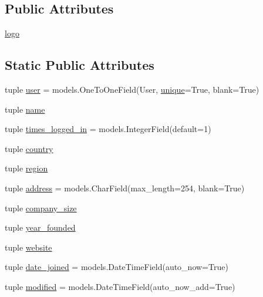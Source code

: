 \subsection*{Public Attributes}
\begin{DoxyCompactItemize}
\item 
\hyperlink{classcompanies_1_1models_1_1_company_a49b6b6445f101f0dae90a69ba01f1ae8}{logo}
\end{DoxyCompactItemize}
\subsection*{Static Public Attributes}
\begin{DoxyCompactItemize}
\item 
tuple \hyperlink{classcompanies_1_1models_1_1_company_ae07154b2ed7072e23019e4bacd78a9ab}{user} = models.\-One\-To\-One\-Field(User, \hyperlink{jquery_8min_8js_a8ac9d5c1e90c48e6dd7efb7db22f1093}{unique}=True, blank=True)
\item 
tuple \hyperlink{classcompanies_1_1models_1_1_company_ac1999fad5498a637267c69735dfacae8}{name}
\item 
tuple \hyperlink{classcompanies_1_1models_1_1_company_a437fd559e316465cde21902f42d08bea}{times\-\_\-logged\-\_\-in} = models.\-Integer\-Field(default=1)
\item 
tuple \hyperlink{classcompanies_1_1models_1_1_company_a8b69497ee6bf195742df2a0d35dba820}{country}
\item 
tuple \hyperlink{classcompanies_1_1models_1_1_company_a338cbaa77e0e881edde3c21620e80354}{region}
\item 
tuple \hyperlink{classcompanies_1_1models_1_1_company_ad368167700b1ab00c332ddc6a8c55de8}{address} = models.\-Char\-Field(max\-\_\-length=254, blank=True)
\item 
tuple \hyperlink{classcompanies_1_1models_1_1_company_a70395dad6162c2cd6206d09bfd078c4e}{company\-\_\-size}
\item 
tuple \hyperlink{classcompanies_1_1models_1_1_company_a92439ab9bbcad33155402816996c88d9}{year\-\_\-founded}
\item 
tuple \hyperlink{classcompanies_1_1models_1_1_company_a52436e833c6ca3ddab6193fbbc1b500a}{website}
\item 
tuple \hyperlink{classcompanies_1_1models_1_1_company_ace8092ca613986f78e6a28e26c006e6a}{date\-\_\-joined} = models.\-Date\-Time\-Field(auto\-\_\-now=True)
\item 
tuple \hyperlink{classcompanies_1_1models_1_1_company_ab0496353663cfe89edf470b3cf9bbd86}{modified} = models.\-Date\-Time\-Field(auto\-\_\-now\-\_\-add=True)

\end{DoxyCompactItemize}
